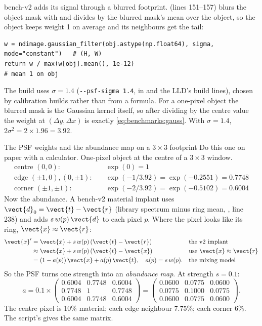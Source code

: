 bench-v2 adds its signal through a blurred footprint.  (lines 151--157) blurs the object mask with
 and divides by the blurred mask's mean over the object, so the object keeps weight 1 on
average and its neighbours get the tail:
\begin{lstlisting}[basicstyle=\ttfamily\footnotesize]
w = ndimage.gaussian_filter(obj.astype(np.float64), sigma, mode="constant")   # (H, W)
return w / max(w[obj].mean(), 1e-12)                                          # mean 1 on obj
\end{lstlisting}
The build uses $\sigma = 1.4$ (\texttt{-{}-psf-sigma 1.4}, in  and
the LLD's build lines), chosen by calibration builds rather than from a formula. For a one-pixel object the blurred
mask is the Gaussian kernel itself, so after dividing by the centre value the weight at $(\Delta y, \Delta x)$ is
exactly \cref{eq:benchmarks:gauss}. With $\sigma = 1.4$, $2\sigma^2 = 2 \times 1.96 = 3.92$.

\begin{worked}[label={we:benchmarks:psf}]{The PSF weights and the abundance map on a $3 \times 3$ footprint}
Do this one on paper with a calculator. One-pixel object at the centre of a $3 \times 3$ window.
\begin{align*}
\text{centre } (0,0): & \quad \exp(0) = 1\\
\text{edge } (\pm1, 0), (0, \pm1): & \quad \exp(-1/3.92) = \exp(-0.2551) = 0.7748\\
\text{corner } (\pm1, \pm1): & \quad \exp(-2/3.92) = \exp(-0.5102) = 0.6004
\end{align*}
Now the abundance. A bench-v2 material implant uses $\vect{d}_0 = \vect{t} - \vect{r}$ (library spectrum minus ring
mean, , line 238) and adds $s\,w(p)\,\vect{d}$ to each pixel $p$. Where the pixel
looks like its ring, $\vect{x} \approx \vect{r}$:
\begin{align*}
\vect{x}' &= \vect{x} + s\,w(p)\,(\vect{t} - \vect{r}) && \text{the v2 implant}\\
&\approx \vect{x} + s\,w(p)\,(\vect{t} - \vect{x}) && \text{use } \vect{x} \approx \vect{r}\\
&= (1 - a(p))\,\vect{x} + a(p)\,\vect{t}, \quad a(p) = s\,w(p). && \text{the mixing model}
\end{align*}
So the PSF turns one strength into an \emph{abundance map}. At strength $s = 0.1$\tagA{}:
\[
a = 0.1 \times \begin{pmatrix} 0.6004 & 0.7748 & 0.6004\\ 0.7748 & 1 & 0.7748\\ 0.6004 & 0.7748 & 0.6004\end{pmatrix}
= \begin{pmatrix} 0.0600 & 0.0775 & 0.0600\\ 0.0775 & 0.1000 & 0.0775\\ 0.0600 & 0.0775 & 0.0600\end{pmatrix}.
\]
The centre pixel is 10\% material; each edge neighbour 7.75\%; each corner 6\%. The script's  gives the
same matrix\tagC{}.
\end{worked}

